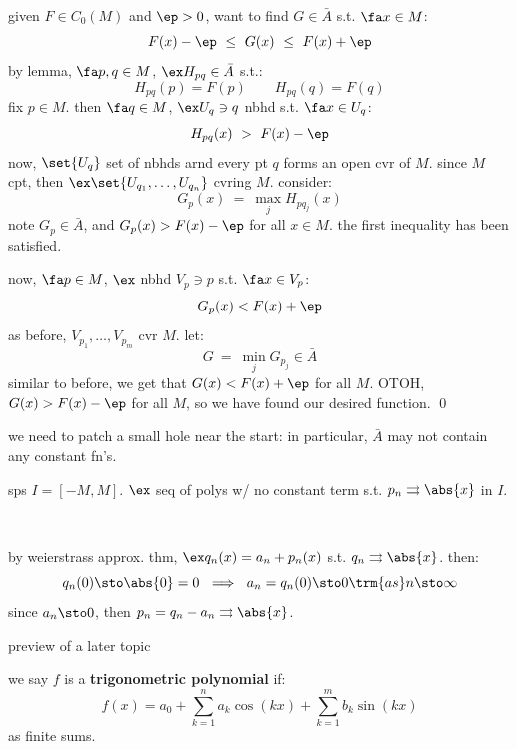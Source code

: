 given $F\in C_{0}(M)$ and $\ep>0$, want to find $G\in\bar{A}$ s.t. $\fa x\in M$:
\begin{equation*}
	F(x)-\ep \ \leq \ G(x) \ \leq \ F(x)+\ep
\end{equation*}
by lemma, $\fa p,q\in M$, $\ex H_{pq}\in\bar{A}$ s.t.:
\begin{equation*}
	H_{pq}(p)=F(p) \qquad H_{pq}(q)=F(q)
\end{equation*}
fix $p\in M$. then $\fa q\in M$, $\ex U_{q}\ni q$ nbhd s.t. $\fa x\in U_{q}$:
\begin{equation*}
	H_{pq}(x) \ > \ F(x)-\ep
\end{equation*}
now, $\set{U_{q}}$ set of nbhds arnd every pt $q$ forms an open cvr of $M$.
since $M$ cpt, then $\ex\set{U_{q_{1}},\dots,U_{q_{n}}}$ cvring $M$. consider:
\begin{equation*}
	G_{p}(x) \ = \ \max_{j}H_{pq_{j}}(x)
\end{equation*}
note $G_{p}\in\bar{A}$, and $G_{p}(x)>F(x)-\ep$ for all $x\in M$.
the first inequality has been satisfied.

now, $\fa p\in M$, $\ex$ nbhd $V_{p}\ni p$ s.t. $\fa x\in V_{p}$:
\begin{equation*}
	G_{p}(x)<F(x)+\ep
\end{equation*}
as before, $V_{p_{1}},\dots,V_{p_{m}}$ cvr $M$. let:
\begin{equation*}
	G \ = \ \min_{j}G_{p_{j}}\in\bar{A}
\end{equation*}
similar to before, we get that $G(x)<F(x)+\ep$ for all $M$.
OTOH, $G(x)>F(x)-\ep$ for all $M$, so we have found our desired function.
\qed

we need to patch a small hole near the start:
in particular, $\bar{A}$ may not contain any constant fn's.
\begin{lm}
	sps $I=[-M,M]$. $\ex$ seq of polys w/ no constant term s.t.
	$p_{n}\rightrightarrows\abs{x}$ in $I$.
\end{lm} \

\begin{pf}[source=Primary Source Material]
	by weierstrass approx. thm, $\ex q_{n}(x)=a_{n}+p_{n}(x)$ s.t.
	$q_{n}\rightrightarrows\abs{x}$. then:
	\begin{equation*}
		q_{n}(0)\sto\abs{0}=0 \ \implies \ a_{n}=q_{n}(0)\sto0 \trm{ as } n\sto\infty
	\end{equation*}
	since $a_{n}\sto0$, then $p_{n}=q_{n}-a_{n}\rightrightarrows\abs{x}$.
\end{pf}

preview of a later topic
\begin{defn}
	we say $f$ is a \textbf{trigonometric polynomial} if:
	\begin{equation*}
		f(x)=a_{0}+\sum_{k=1}^{n}a_{k}\cos(kx)+\sum_{k=1}^{m}b_{k}\sin(kx)
	\end{equation*}
	as finite sums.
\end{defn} \

